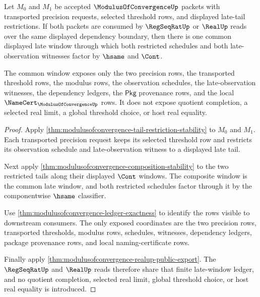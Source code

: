 \begin{theorem}\label{thm:modulusofconvergence-paired-late-window-common-refinement}
Let $M_0$ and $M_1$ be accepted $\ModulusOfConvergenceUp$ packets with
transported precision requests, selected threshold rows, and displayed
late-tail restrictions. If both packets are consumed by $\RegSeqRatUp$ or
$\RealUp$ reads over the same displayed dependency boundary, then there is one
common displayed late window through which both restricted schedules and both
late-observation witnesses factor by $\hsame$ and $\Cont$.

The common window exposes only the two precision rows, the transported
threshold rows, the modulus rows, the observation schedules, the
late-observation witnesses, the dependency ledgers, the $\mathsf{Pkg}$
provenance rows, and the local $\NameCert_{\ModulusOfConvergenceUp}$ rows. It
does not expose quotient completion, a selected real limit, a global threshold
choice, or host real equality.
\end{theorem}
\begin{proof}
Apply \autoref{thm:modulusofconvergence-tail-restriction-stability} to $M_0$
and $M_1$. Each transported precision request keeps its selected threshold row
and restricts its observation schedule and late-observation witness to a
displayed late tail.

Next apply \autoref{thm:modulusofconvergence-composition-stability} to the two
restricted tails along their displayed $\Cont$ windows. The composite window is
the common late window, and both restricted schedules factor through it by the
componentwise $\hsame$ classifier.

Use \autoref{thm:modulusofconvergence-ledger-exactness} to identify the rows
visible to downstream consumers. The only exposed coordinates are the two
precision rows, transported thresholds, modulus rows, schedules, witnesses,
dependency ledgers, package provenance rows, and local naming-certificate rows.

Finally apply \autoref{thm:modulusofconvergence-realup-public-export}. The
$\RegSeqRatUp$ and $\RealUp$ reads therefore share that finite late-window
ledger, and no quotient completion, selected real limit, global threshold
choice, or host real equality is introduced.
\end{proof}

